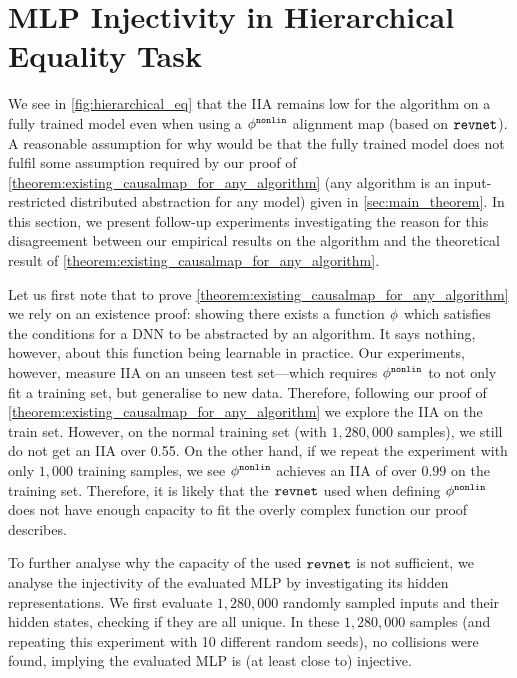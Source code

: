 \section{MLP Injectivity in Hierarchical Equality Task}\label{appsec:MLP_Injectivity_in_Hierarchical_Equality_Task}

We see in \cref{fig:hierarchical_eq} that the IIA remains low for the \algidentityoffirst algorithm on a fully trained model even when using a $\phi^{\mathtt{nonlin}}$ alignment map (based on $\mathtt{revnet}$). 
A reasonable assumption for why would be that the fully trained model does not fulfil some assumption required by our proof of \cref{theorem:existing_causalmap_for_any_algorithm} (any algorithm is an input-restricted distributed abstraction for any model) given in \cref{sec:main_theorem}. 
In this section, we present follow-up experiments investigating the reason for this disagreement between our empirical results on the \algidentityoffirst algorithm and the theoretical result of \cref{theorem:existing_causalmap_for_any_algorithm}.

Let us first note that to prove \cref{theorem:existing_causalmap_for_any_algorithm} we rely on an existence proof: showing there exists a function $\phi$ which satisfies the conditions for a DNN to be abstracted by an algorithm.
It says nothing, however, about this function being learnable in practice.
Our experiments, however, measure IIA on an unseen test set---which requires $\phi^{\mathtt{nonlin}}$ to not only fit a training set, but generalise to new data. 
Therefore, following our proof of \cref{theorem:existing_causalmap_for_any_algorithm} we explore the IIA on the train set. 
However, on the normal training set (with $1{,}280{,}000$ samples), we still do not get an IIA over 0.55. 
On the other hand, if we repeat the experiment with only $1{,}000$ training samples, we see $\phi^{\mathtt{nonlin}}$ achieves an IIA of over $0.99$ on the training set. 
Therefore, it is likely that the $\mathtt{revnet}$ used when defining $\phi^{\mathtt{nonlin}}$ does not have enough capacity to fit the overly complex function our proof describes.

To further analyse why the capacity of the used $\mathtt{revnet}$ is not sufficient, we analyse the injectivity of the evaluated MLP by investigating its hidden representations.
We first evaluate $1{,}280{,}000$ randomly sampled inputs and their hidden states, checking if they are all unique. 
In these $1{,}280{,}000$ samples (and repeating this experiment with 10 different random seeds), no collisions were found, implying the evaluated MLP is (at least close to) injective. 

